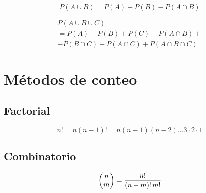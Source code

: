 \begin{mdframed}[style=PropertyFrame]
    \begin{prop}
    \end{prop}
    \begin{equation*}
        P(A \cup B) = P(A) + P(B) - P(A \cap B)
    \end{equation*}
\end{mdframed}

\begin{mdframed}[style=PropertyFrame]
    \begin{prop}
    \end{prop}
    \begin{gather*}
        P (A \cup B \cup C) =
        \\
        =P(A) + P(B) + P(C) - P(A \cap B) +
        \\
        - P(B \cap C) - P(A \cap C) + P(A \cap B \cap C)
    \end{gather*}
\end{mdframed}


\section{Métodos de conteo}


\subsection{Factorial}

\begin{mdframed}[style=DefinitionFrame]
    \begin{defn}
    \end{defn}
    \begin{equation*}
        n! = n(n-1)! = n(n-1)(n-2) \dots 3 \cdot 2 \cdot 1
    \end{equation*}
\end{mdframed}


\subsection{Combinatorio}

\begin{mdframed}[style=DefinitionFrame]
    \begin{defn}
    \end{defn}
    \begin{equation*}
        \begin{pmatrix} {n}\\{m} \end{pmatrix} = \frac{n!}{(n-m)! \, m!}
    \end{equation*}
\end{mdframed}


